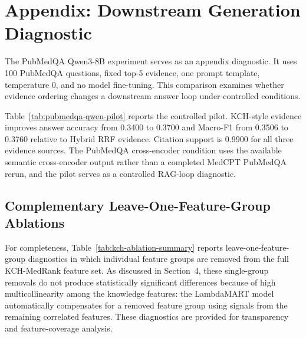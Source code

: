 \section{Appendix: Downstream Generation Diagnostic}

The PubMedQA Qwen3-8B experiment serves as an appendix diagnostic. It uses 100 PubMedQA questions, fixed top-5 evidence, one prompt template, temperature 0, and no model fine-tuning. This comparison examines whether evidence ordering changes a downstream answer loop under controlled conditions.

Table~\ref{tab:pubmedqa-qwen-pilot} reports the controlled pilot. KCH-style evidence improves answer accuracy from 0.3400 to 0.3700 and Macro-F1 from 0.3506 to 0.3760 relative to Hybrid RRF evidence. Citation support is 0.9900 for all three evidence sources. The PubMedQA cross-encoder condition uses the available semantic cross-encoder output rather than a completed MedCPT PubMedQA rerun, and the pilot serves as a controlled RAG-loop diagnostic.



\subsection{Complementary Leave-One-Feature-Group Ablations}

For completeness, Table~\ref{tab:kch-ablation-summary} reports leave-one-feature-group diagnostics in which individual feature groups are removed from the full KCH-MedRank feature set. As discussed in Section~4, these single-group removals do not produce statistically significant differences because of high multicollinearity among the knowledge features: the LambdaMART model automatically compensates for a removed feature group using signals from the remaining correlated features. These diagnostics are provided for transparency and feature-coverage analysis.


